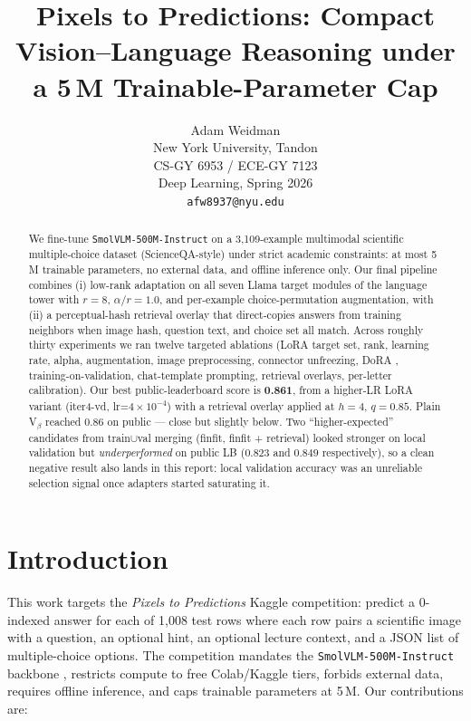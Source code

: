 \documentclass[11pt]{article}
\title{Pixels to Predictions: Compact Vision--Language Reasoning under a 5\,M Trainable-Parameter Cap}
\author{
  Adam Weidman \\
  New York University, Tandon \\
  CS-GY 6953 / ECE-GY 7123 \\
  Deep Learning, Spring 2026 \\
  \texttt{afw8937@nyu.edu}
}
\begin{document}
\maketitle

\begin{abstract}
We fine-tune \texttt{SmolVLM-500M-Instruct} on a 3{,}109-example multimodal scientific multiple-choice dataset (ScienceQA-style) under strict academic constraints: at most 5\,M trainable parameters, no external data, and offline inference only. Our final pipeline combines (i) low-rank adaptation \citep{hu2022lora} on all seven Llama target modules of the language tower with $r=8$, $\alpha/r=1.0$, and per-example choice-permutation augmentation, with (ii) a perceptual-hash retrieval overlay that direct-copies answers from training neighbors when image hash, question text, and choice set all match. Across roughly thirty experiments we ran twelve targeted ablations (LoRA target set, rank, learning rate, alpha, augmentation, image preprocessing, connector unfreezing, DoRA \citep{liu2024dora}, training-on-validation, chat-template prompting, retrieval overlays, per-letter calibration). Our best public-leaderboard score is \textbf{0.861}, from a higher-LR LoRA variant (iter4-vd, lr=$4\!\times\!10^{-4}$) with a retrieval overlay applied at $h=4$, $q=0.85$. Plain V$_\beta$ reached 0.86 on public --- close but slightly below. Two ``higher-expected'' candidates from train$\cup$val merging (finfit, finfit + retrieval) looked stronger on local validation but \emph{underperformed} on public LB ($0.823$ and $0.849$ respectively), so a clean negative result also lands in this report: local validation accuracy was an unreliable selection signal once adapters started saturating it.
\end{abstract}

\section{Introduction}

This work targets the \emph{Pixels to Predictions} Kaggle competition: predict a 0-indexed answer for each of 1{,}008 test rows where each row pairs a scientific image with a question, an optional hint, an optional lecture context, and a JSON list of multiple-choice options. The competition mandates the \texttt{SmolVLM-500M-Instruct} backbone \citep{laurencon2024smolvlm}, restricts compute to free Colab/Kaggle tiers, forbids external data, requires offline inference, and caps trainable parameters at 5\,M. Our contributions are:
\end{document}
